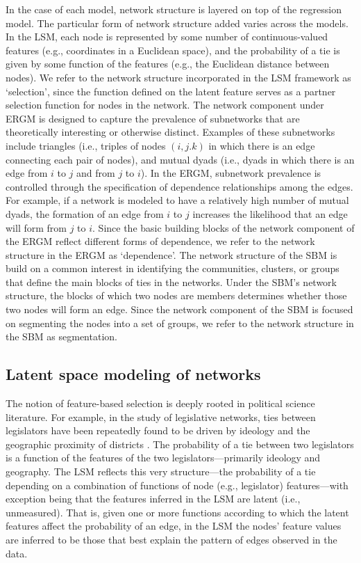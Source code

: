 \documentclass[fleqn,12pt]{wlscirep}
\begin{document}
In the case of each model, network structure is layered on top of the regression model. The particular form of network structure added varies across the models. In the LSM, each node is represented by some number of continuous-valued features (e.g., coordinates in a Euclidean space), and the probability of a tie is given by some function of the features (e.g., the Euclidean distance between nodes). We refer to the network structure incorporated in the LSM framework as `selection', since the function defined on the latent feature serves as a partner selection function for nodes in the network. The network component under ERGM is designed to capture the prevalence of subnetworks that are theoretically interesting or otherwise distinct. Examples of these subnetworks include triangles (i.e., triples of nodes $(i,j.k)$ in which there is an edge connecting each pair of nodes), and mutual dyads (i.e., dyads in which there is an edge from $i$ to $j$ and from $j$ to $i$). In the ERGM, subnetwork prevalence is controlled through the specification of dependence relationships among the edges. For example, if a network is modeled to have a relatively high number of mutual dyads, the formation of an edge from $i$ to $j$ increases the likelihood that an edge will form from $j$ to $i$. Since the basic building blocks of the network component of the ERGM reflect different forms of dependence, we refer to the network structure in the ERGM as `dependence'. The network structure of the SBM is build on a common interest in identifying the communities, clusters, or groups that define the main blocks of ties in the networks. Under the SBM's network structure, the blocks of which two nodes are members determines whether those two nodes will form an edge. Since the network component of the SBM is focused on segmenting the nodes into a set of groups, we refer to the network structure in the SBM as segmentation.

\subsection{Latent space modeling of networks}

The notion of feature-based selection is deeply rooted in political science literature. For example, in the study of legislative networks, ties between legislators have been repeatedly found to be driven by ideology and the geographic proximity of districts \citep{osei2018party,bratton2011networks,clark2013multimember}.  The probability of a tie between two legislators is a function of the features of the two legislators---primarily ideology and geography. The LSM reflects this very structure---the probability of a tie depending on a combination of functions of node (e.g., legislator) features---with exception being that the features inferred in the LSM are latent (i.e., unmeasured). That is, given one or more functions according to which the latent features affect the probability of an edge, in the LSM the nodes' feature values are inferred to be those that best explain the pattern of edges observed in the data.
\end{document}
